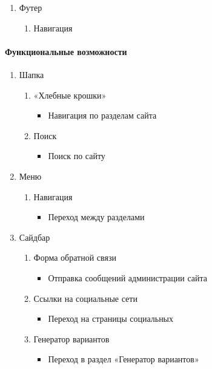 \begin{enumerate}
	\item Футер
	\begin{enumerate}
		\item Навигация
	\end{enumerate}
\end{enumerate}

\paragraph{Функциональные возможности}
\begin{enumerate}
	\item Шапка
	\begin{enumerate}
		\item «Хлебные крошки»
		\begin{itemize}
			\item Навигация по разделам сайта
		\end{itemize}
		\item Поиск
		\begin{itemize}
			\item Поиск по сайту
		\end{itemize}
	\end{enumerate}

	\item Меню
	\begin{enumerate}
		\item Навигация
		\begin{itemize}
			\item Переход между разделами
		\end{itemize}
	\end{enumerate}

	\item Сайдбар
	\begin{enumerate}
		\item Форма обратной связи
		\begin{itemize}
			\item Отправка сообщений администрации сайта
		\end{itemize}

		\item Ссылки на социальные сети
		\begin{itemize}
			\item Переход на страницы социальных 
		\end{itemize}

		\item Генератор вариантов
		\begin{itemize}
			\item Переход в раздел «Генератор вариантов»
		\end{itemize}
	\end{enumerate}


\end{enumerate}
